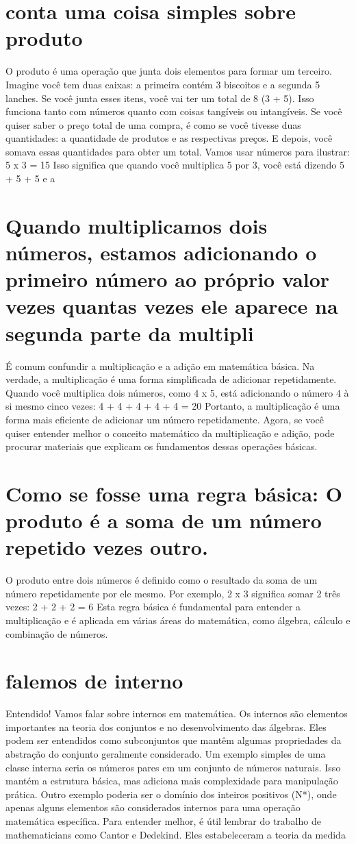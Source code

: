 \documentclass[11pt,a4paper]{article}
\begin{document}
\section{conta uma coisa simples sobre produto}
O produto é uma operação que junta dois elementos para formar um terceiro. Imagine você tem duas caixas: a primeira contém 3 biscoitos e a segunda 5 lanches. Se você junta esses itens, você vai ter um total de 8 (3 + 5). Isso funciona tanto com números quanto com coisas tangíveis ou intangíveis. Se você quiser saber o preço total de uma compra, é como se você tivesse duas quantidades: a quantidade de produtos e as respectivas preços. E depois, você somava essas quantidades para obter um total. Vamos usar números para ilustrar: 5 x 3 = 15 Isso significa que quando você multiplica 5 por 3, você está dizendo 5 + 5 + 5 e a

\section{Quando multiplicamos dois números, estamos adicionando o primeiro número ao próprio valor vezes quantas vezes ele aparece na segunda parte da multipli}
É comum confundir a multiplicação e a adição em matemática básica. Na verdade, a multiplicação é uma forma simplificada de adicionar repetidamente. Quando você multiplica dois números, como 4 x 5, está adicionando o número 4 à si mesmo cinco vezes: 4 + 4 + 4 + 4 + 4 = 20 Portanto, a multiplicação é uma forma mais eficiente de adicionar um número repetidamente. Agora, se você quiser entender melhor o conceito matemático da multiplicação e adição, pode procurar materiais que explicam os fundamentos dessas operações básicas.

\section{Como se fosse uma regra básica: O produto é a soma de um número repetido vezes outro.}
O produto entre dois números é definido como o resultado da soma de um número repetidamente por ele mesmo. Por exemplo, 2 x 3 significa somar 2 três vezes: 2 + 2 + 2 = 6 Esta regra básica é fundamental para entender a multiplicação e é aplicada em várias áreas do matemática, como álgebra, cálculo e combinação de números.

\section{falemos de interno}
Entendido! Vamos falar sobre internos em matemática. Os internos são elementos importantes na teoria dos conjuntos e no desenvolvimento das álgebras. Eles podem ser entendidos como subconjuntos que mantêm algumas propriedades da abstração do conjunto geralmente considerado. Um exemplo simples de uma classe interna seria os números pares em um conjunto de números naturais. Isso mantém a estrutura básica, mas adiciona mais complexidade para manipulação prática. Outro exemplo poderia ser o domínio dos inteiros positivos (N*), onde apenas alguns elementos são considerados internos para uma operação matemática específica. Para entender melhor, é útil lembrar do trabalho de mathematicians como Cantor e Dedekind. Eles estabeleceram a teoria da medida
\end{document}
